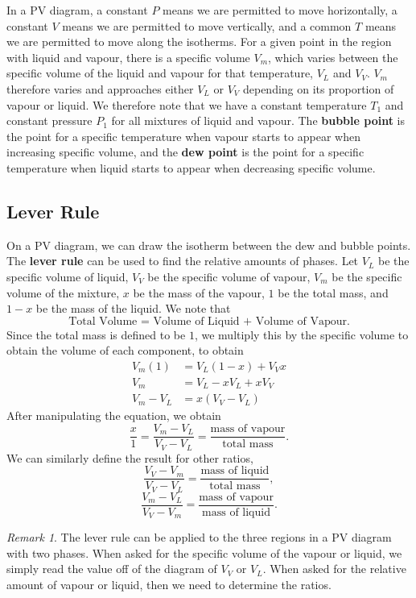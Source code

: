\documentclass[11pt]{article}
\theoremstyle{plain} %
\theoremstyle{definition}
\theoremstyle{example}
\theoremstyle{remark}
\newtheorem*{remark}{Remark}
\begin{document}
In a PV diagram, a constant $P$ means we are permitted to move horizontally, a constant $V$ means we are permitted to move vertically, and a common $T$ means we are permitted to move along the isotherms. For a given point in the region with liquid and vapour, there is a specific volume $V_m$, which varies between the specific volume of the liquid and vapour for that temperature, $V_L$ and $V_V$. $V_m$ therefore varies and approaches either $V_L$ or $V_V$ depending on its proportion of vapour or liquid. We therefore note that we have a constant temperature $T_1$ and constant pressure $P_1$ for all mixtures of liquid and vapour. The \textbf{bubble point} is the point for a specific temperature when vapour starts to appear when increasing specific volume, and the \textbf{dew point} is the point for a specific temperature when liquid starts to appear when decreasing specific volume. 

\subsection{Lever Rule}

On a PV diagram, we can draw the isotherm between the dew and bubble points. The \textbf{lever rule} can be used to find the relative amounts of phases. Let $V_L$ be the specific volume of liquid, $V_V$ be the specific volume of vapour, $V_m$ be the specific volume of the mixture, $x$ be the mass of the vapour, $1$ be the total mass, and $1-x$ be the mass of the liquid. We note that 
$$\text{Total Volume = Volume of Liquid + Volume of Vapour}.$$
Since the total mass is defined to be $1$, we multiply this by the specific volume to obtain the volume of each component, to obtain 
\begin{align*}
V_m(1) &= V_L(1-x) +V_Vx\\
V_m &= V_L-xV_L+xV_V\\
V_m-V_L &= x(V_V-V_L)
\end{align*}
After manipulating the equation, we obtain
$$\frac{x}{1} = \frac{V_m-V_L}{V_V-V_L} = \frac{\text{mass of vapour}}{\text{total mass}}.$$
We can similarly define the result for other ratios,
$$\frac{V_V-V_m}{V_V-V_L} = \frac{\text{mass of liquid}}{\text{total mass}},$$
$$\frac{V_m-V_L}{V_V-V_m} = \frac{\text{mass of vapour}}{\text{mass of liquid}}.$$

\begin{remark}
The lever rule can be applied to the three regions in a PV diagram with two phases. When asked for the specific volume of the vapour or liquid, we simply read the value off of the diagram of $V_V$ or $V_L$. When asked for the relative amount of vapour or liquid, then we need to determine the ratios. 
\end{remark}
\end{document}
